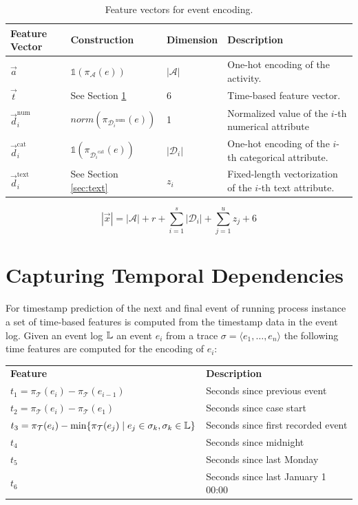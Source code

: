 \begin{table}[!htbp]
\renewcommand{\arraystretch}{1.2}
\begin{tabularx}{\textwidth}{p{2cm} l l p{6.8cm} }
	\toprule
	 \textbf{Feature} \newline \textbf{Vector} & \textbf{Construction} &\textbf{Dimension} &  \textbf{Description} \\
	 \midrule
	 	$\vec{a}$ &$\mathds{1}(\pi_\mathcal{A}(e))$& $|\mathcal{A}|$& One-hot encoding of the activity. \\
	 	$\vec{t}$ & See Section \ref{sec:time} &6 & Time-based feature vector.\\
	 	$\vec{d}_i^\mathrm{num}$ &  $norm(\pi_{{\mathcal{D}_i}^\mathrm{num}}(e)) $ &1 & Normalized value of the $i$-th numerical attribute\\
	 	$\vec{d}_i^\mathrm{cat}$ & $\mathds{1}(\pi_{{\mathcal{D}_i}^\mathrm{cat}}(e))$&$|\mathcal{D}_i|$ & One-hot encoding of the $i$-th categorical attribute.\\
	 	$\vec{d}_i^\mathrm{text}$ & See Section \ref{sec:text} & $z_i$& Fixed-length vectorization of the $i$-th text attribute.\\
	\bottomrule
\end{tabularx}
	\caption{Feature vectors for event encoding.}
	\label{tab:features}
\end{table}

\begin{equation}
	|\vec{x}|= |\mathcal{A}| + r + \sum_{i=1}^{s} |\mathcal{D}_i| + \sum_{j=1}^{u} z_j + 6
\end{equation}


\section{Capturing Temporal Dependencies}\label{sec:time}


For timestamp prediction of the next and final event of running process instance a set of time-based features is computed from the timestamp data in the event log.
Given an event log $\mathbb{L}$ an event $e_i$ from a trace $\sigma = \langle e_1, \dots, e_n \rangle$ the following time features are computed for the encoding of $e_i$: 

\begin{center}
\begin{tabularx}{\textwidth}{l l}
	\centering
	 \textbf{Feature} & \textbf{Description} \\
	$t_1 = \pi_\mathcal{T}(e_i) - \pi_\mathcal{T}(e_{i-1})$ & Seconds since previous event \\
	$t_2 = \pi_\mathcal{T}(e_i) - \pi_\mathcal{T}(e_1)$ & Seconds since case start \\
	$t_3 = \pi_\mathcal{T}(e_i) - \min\{\pi_\mathcal{T}(e_{j}) \mid  e_j \in \sigma_k, \sigma_k \in \mathbb{L}\}$ & Seconds since first recorded event \\
	$t_4$ & Seconds since midnight \\
	$t_5$ & Seconds since last Monday \\
	$t_6$ & Seconds since last January 1 00:00
\end{tabularx}
\end{center}

